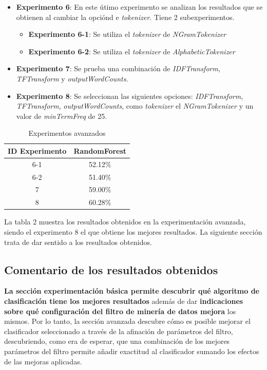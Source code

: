\documentclass[12pt,a4paper, xcolor=table]{article}
\begin{document}
        \begin{itemize}
          \item \textbf{Experimento 6}: En este útimo experimento se analizan los resultados que se obtienen al cambiar la opciónd e \textit{tokenizer}. Tiene 2 subexperimentos.
          \begin{itemize}
            \item \textbf{Experimento 6-1}: Se utiliza el \textit{tokenizer} de \textit{NGramTokenizer}
            \item \textbf{Experimento 6-2}: Se utiliza el \textit{tokenizer} de \textit{AlphabeticTokenizer}
          \end{itemize}
          \item \textbf{Experimento 7}: Se prueba una combinación de \textit{IDFTransform}, \textit{TFTransform} y \textit{outputWordCounts}.
          \item \textbf{Experimento 8}: Se seleccionan las siguientes opciones: \textit{IDFTransform}, \textit{TFTransform}, \textit{outputWordCounts}, como \textit{tokenizer} el \textit{NGramTokenizer} y un valor de \textit{minTermFreq} de 25.
        \end{itemize}

        \begin{table}[h]
            \centering
            \begin{tabular}{|c|c|}
            \hline
            \rowcolor[HTML]{DAE8FC}
            \textbf{ID Experimento} & \textbf{RandomForest} \\ \hline
            6-1                     & 52.12\%               \\ \hline
            6-2                     & 51.40\%               \\ \hline
            7                       & 59.00\%               \\ \hline
            8                       & 60.28\%               \\ \hline
            \end{tabular}
            \caption{Experimentos avanzados}
                \label{fig:graf_exp1}
        \end{table}

        La tabla 2 muestra los resultados obtenidos en la experimentación avanzada, siendo el experimento 8 el que obtiene los mejores resultados. La siguiente sección trata de dar sentido a los resultados obtenidos.

    \subsection{Comentario de los resultados obtenidos}
    \textbf{ La sección experimentación básica permite descubrir qué algoritmo de clasificación tiene los mejores resultados} además de dar \textbf{indicaciones sobre qué configuración del filtro de minería de datos mejora} los mismos. Por lo tanto, la sección avanzada descubre cómo es posible mejorar el clasificador seleccionado a través de la afinación de parámetros del filtro, descubriendo, como era de esperar, que una combinación de los mejores parámetros del filtro permite añadir exactitud al clasificador sumando los efectos de las mejoras aplicadas. 
    
\end{document}
